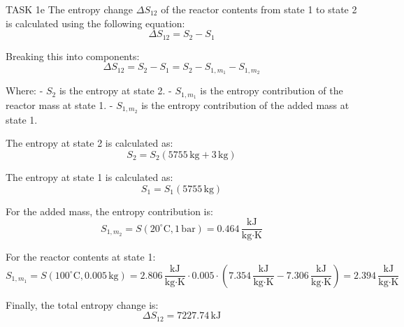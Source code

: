 TASK 1e  
The entropy change \( \Delta S_{12} \) of the reactor contents from state 1 to state 2 is calculated using the following equation:  
\[
\Delta S_{12} = S_2 - S_1
\]  

Breaking this into components:  
\[
\Delta S_{12} = S_2 - S_1 = S_2 - S_{1,m_1} - S_{1,m_2}
\]  

Where:  
- \( S_2 \) is the entropy at state 2.  
- \( S_{1,m_1} \) is the entropy contribution of the reactor mass at state 1.  
- \( S_{1,m_2} \) is the entropy contribution of the added mass at state 1.  

The entropy at state 2 is calculated as:  
\[
S_2 = S_2(5755 \, \text{kg} + 3 \, \text{kg})
\]  

The entropy at state 1 is calculated as:  
\[
S_1 = S_1(5755 \, \text{kg})
\]  

For the added mass, the entropy contribution is:  
\[
S_{1,m_2} = S(20^\circ\text{C}, 1 \, \text{bar}) = 0.464 \, \frac{\text{kJ}}{\text{kg·K}}
\]  

For the reactor contents at state 1:  
\[
S_{1,m_1} = S(100^\circ\text{C}, 0.005 \, \text{kg}) = 2.806 \, \frac{\text{kJ}}{\text{kg·K}} \cdot 0.005 \cdot \left(7.354 \, \frac{\text{kJ}}{\text{kg·K}} - 7.306 \, \frac{\text{kJ}}{\text{kg·K}}\right) = 2.394 \, \frac{\text{kJ}}{\text{kg·K}}
\]  

Finally, the total entropy change is:  
\[
\Delta S_{12} = 7227.74 \, \text{kJ}
\]